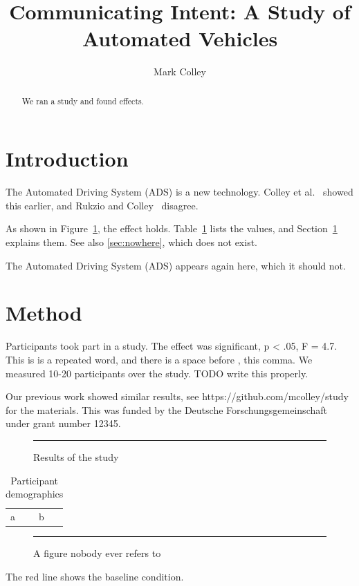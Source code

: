 \documentclass[sigconf,review]{acmart}
\begin{document}
\title{Communicating Intent: A Study of Automated Vehicles}
\author{Mark Colley}

\begin{abstract}
We ran a study and found effects.
\end{abstract}

\section{Introduction}
\label{sec:intro}

The Automated Driving System (ADS) is a new technology. Colley et
al.~\cite{colley2021} showed this earlier, and Rukzio and
Colley~\cite{rukzio2020} disagree.

As shown in Figure~\ref{fig:results}, the effect holds. Table~\ref{tab:demo}
lists the values, and Section~\ref{sec:intro} explains them. See also
\ref{sec:nowhere}, which does not exist.

The Automated Driving System (ADS) appears again here, which it should not.

\section{Method}

Participants took part in a study. The effect was significant, p < .05,
F = 4.7. This is is a repeated word, and there is a space before , this comma.
We measured 10-20 participants over the study. TODO write this properly.

Our previous work showed similar results, see
https://github.com/mcolley/study for the materials. This was funded by the
Deutsche Forschungsgemeinschaft under grant number 12345.

\begin{figure}
  \centering
  \rule{4cm}{2cm}
  \caption{Results of the study}
  \label{fig:results}
\end{figure}

\begin{table}
  \centering
  \caption{Participant demographics}
  \label{tab:demo}
  \begin{tabular}{ll}
    a & b \\
  \end{tabular}
\end{table}

\begin{figure}
  \centering
  \rule{4cm}{2cm}
  \caption{A figure nobody ever refers to}
  \label{fig:orphan}
\end{figure}

The red line shows the baseline condition.



\end{document}

